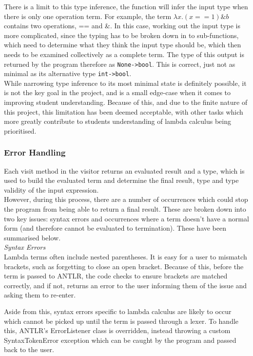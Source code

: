 \documentclass[a4paper,11pt]{report}
\begin{document}
There is a limit to this type inference, the function will infer the input type when there is only one operation term. For example, the term $\lambda x.(x==1)\&b$ contains two operations, == and \&. In this case, working out the input type is more complicated, since the typing has to be broken down in to sub-functions, which need to determine what they think the input type should be, which then needs to be examined collectively as a complete term. The type of this output is returned by the program therefore as \texttt{None->bool}. This is correct, just not as minimal as its alternative type \texttt{int->bool}.\\

While narrowing type inference to its most minimal state is definitely possible, it is not the key goal in the project, and is a small edge-case when it comes to improving student understanding. Because of this, and due to the finite nature of this project, this limitation has been deemed acceptable, with other tasks which more greatly contribute to students understanding of lambda calculus being prioritised.

\subsubsection{Error Handling}
Each visit method in the visitor returns an evaluated result and a type, which is used to build the evaluated term and determine the final result, type and type validity of the input expression.\\

However, during this process, there are a number of occurrences which could stop the program from being able to return a final result. These are broken down into two key issues: syntax errors and occurrences where a term doesn't have a normal form (and therefore cannot be evaluated to termination). These have been summarised below.\\

\textit{Syntax Errors}\\
Lambda terms often include nested parentheses. It is easy for a user to mismatch brackets, such as forgetting to close an open bracket. Because of this, before the term is passed to ANTLR, the code checks to ensure brackets are matched correctly, and if not, returns an error to the user informing them of the issue and asking them to re-enter.

Aside from this, syntax errors specific to lambda calculus are likely to occur which cannot be picked up until the term is passed through a lexer. To handle this, ANTLR's ErrorListener class is overridden, instead throwing a custom SyntaxTokenError exception which can be caught by the program and passed back to the user.\\
\end{document}
